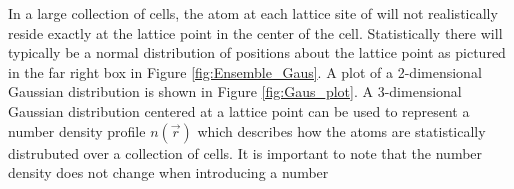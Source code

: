 \documentclass[double,12pt]{beavtex}
\begin{document}

In a large collection of cells, the atom at each lattice site of 
will not realistically reside exactly at the lattice point in the center 
of the cell. Statistically there will typically be a normal distribution 
of positions about the lattice point as pictured in the far right box in 
Figure \ref{fig:Ensemble_Gaus}. A plot of a 2-dimensional Gaussian 
distribution is shown in Figure \ref{fig:Gaus_plot}. 
A 3-dimensional Gaussian distribution centered at a lattice point can be used to represent 
a number density profile $n(\vec{r})$  which describes how the atoms are 
statistically distrubuted over a collection of cells. 
It is important to note that the number density does not change when introducing a number 
\end{document}
